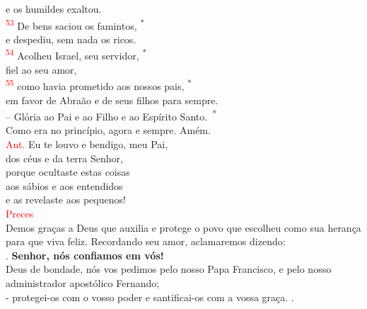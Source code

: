 \documentclass{book}
\begin{document}
\begin{center}
    e os humildes exaltou.
    \vspace{.2cm} \\
    \textsuperscript{\underline{\hspace{.07in}}\textcolor{red}{53}} De bens saciou os famintos, \textsuperscript{*}\\
    e despediu, sem nada os ricos. \\
    \textsuperscript{\underline{\hspace{.07in}}\textcolor{red}{54}} Acolheu Israel, seu servidor, \textsuperscript{*} \\
    fiel ao seu amor,
    \vspace{.2cm} \\
    \textsuperscript{\underline{\hspace{.07in}}\textcolor{red}{55}} como havia prometido aos nossos pais, \textsuperscript{*} \\
    em favor de Abraão e de seus filhos para sempre.
    \vspace{.2cm} \\
    -- Glória ao Pai e ao Filho e ao Espírito Santo.\ \textsuperscript{*} \\
    Como era no princípio, agora e sempre. Amém.
    \vspace{.2cm} \\
    \textcolor{red}{Ant.} Eu te louvo e bendigo, meu Pai, \\
    dos céus e da terra Senhor, \\
    porque ocultaste estas coisas \\
    aos sábios e aos entendidos \\
    e as revelaste aos pequenos!
    \vspace{.2cm} \\
    \textcolor{red}{Preces}
    \vspace{.2cm} \\
    Demos graças a Deus que auxilia e protege o povo que escolheu como sua herança para que viva feliz. Recordando seu amor, aclamaremos dizendo:
    \vspace{.2cm} \\
    {\color{red} \Rbar.} \textbf{Senhor, nós confiamos em vós!}
    \vspace{.2cm} \\
    Deus de bondade, nós vos pedimos pelo nosso Papa Francisco, e pelo nosso administrador apostólico Fernando; \\
    - protegei-os com o vosso poder e santificai-os com a vossa graça.  {\color{red} \Rbar.}

\end{center}
\end{document}
